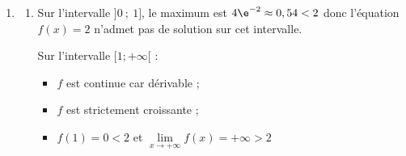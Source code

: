 \begin{enumerate}
\begin{enumerate}
On a alors :\quad $\forall x \in ]0;+\infty[ 
\begin{cases} u'(x)=1 \\ v'(x)=2 \times \dfrac{1}{x} \times \ln x 
\end{cases}$ 

Or :\quad $f' = u'v+v'u$ 

Donc, $\aligned[t]\forall x \in ] 0 ;+\infty[, \quad f'(x)&= 1 \times (\ln x)^2 + x \times \dfrac{2 \ln x}{x}\\
		&= \ln x \times \ln x + 2 \ln x \\
		&=(\ln x)(\ln x +2)
\endaligned$
		
Donc sur l'intervalle $]0~;~+\infty[$, \: $f'(x) = (\ln x)(2 + \ln x)$.

	\item On en déduit les variations de la fonction $f$ sur l'intervalle $]0~;~+\infty[$.

Étudions le signe de $f'(x)$ : 

$2+ \ln(x)> 0 \Longleftrightarrow \ln x > -2 \Longleftrightarrow x > \e^{-2}$ 

$\ln x > 0 \Longleftrightarrow x >1$ 

On a donc le tableau de variations suivant : 

\hfill~\hfill~

		\item $f\left(\e^{-2}\right) = \e^{-2} \left( \ln \left(\e^{-2}\right) \right) ^2= \e^{-2} \times (-2)^2= 4 \e^{-2}$

Le maximum de la fonction $f$ sur l'intervalle $]0~;~1]$ est $4\e^{-2}$.
	\end{enumerate}

\item %
	\begin{enumerate}
		\item Sur l'intervalle $]0~;~1]$, le maximum est $4\e^{-2} \approx 0,54 < 2$ donc l'équation $f(x) = 2$ n'admet pas de solution sur cet intervalle.

Sur l'intervalle $[1; +\infty[$ : 
\begin{itemize}
	\item $f$ est continue car dérivable ;
	\item $f$ est strictement croissante ;
	\item $f(1) =0 <2$ et $\lim\limits_{x \to +\infty} f(x)= +\infty >2$ 
\end{itemize}


\end{enumerate}
\end{enumerate}
